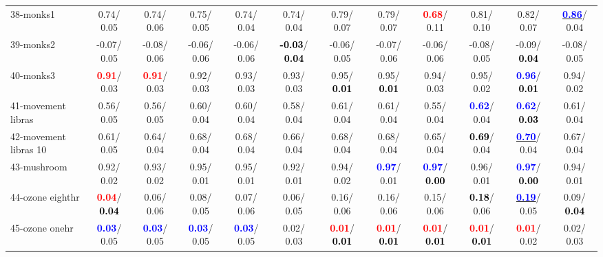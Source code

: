 \begin{table}[h]
\begin{center}
{\begin{tabular}{lc|c|c|c|c|c|c|c|c|c|c}
38-monks1 &   0.74/  0.05 &   0.74/  0.06 &   0.75/  0.05 &   0.74/  0.04 &   0.74/  0.04 &   0.79/  0.07 &   0.79/  0.07 & \textcolor{red}{\textbf{  0.68}}/  0.11 &   0.81/  0.10 &   0.82/  0.07 & \underline{\textcolor{blue}{\textbf{  0.86}}}/  0.04 \\
39-monks2 &  -0.07/  0.05 &  -0.08/  0.06 &  -0.06/  0.06 &  -0.06/  0.06 & \textcolor{black}{\textbf{ -0.03}}/\textcolor{black}{\textbf{  0.04}} &  -0.06/  0.05 &  -0.07/  0.06 &  -0.06/  0.06 &  -0.08/  0.05 &  -0.09/\textcolor{black}{\textbf{  0.04}} &  -0.08/  0.05 \\ \hline
40-monks3 & \textcolor{red}{\textbf{  0.91}}/  0.03 & \textcolor{red}{\textbf{  0.91}}/  0.03 &   0.92/  0.03 &   0.93/  0.03 &   0.93/  0.03 &   0.95/\textcolor{black}{\textbf{  0.01}} &   0.95/\textcolor{black}{\textbf{  0.01}} &   0.94/  0.03 &   0.95/  0.02 & \textcolor{blue}{\textbf{  0.96}}/\textcolor{black}{\textbf{  0.01}} &   0.94/  0.02 \\
41-movement libras &   0.56/  0.05 &   0.56/  0.05 &   0.60/  0.04 &   0.60/  0.04 &   0.58/  0.04 &   0.61/  0.04 &   0.61/  0.04 &   0.55/  0.04 & \textcolor{blue}{\textbf{  0.62}}/  0.04 & \textcolor{blue}{\textbf{  0.62}}/\textcolor{black}{\textbf{  0.03}} &   0.61/  0.04 \\
42-movement libras 10 &   0.61/  0.05 &   0.64/  0.04 &   0.68/  0.04 &   0.68/  0.04 &   0.66/  0.04 &   0.68/  0.04 &   0.68/  0.04 &   0.65/  0.04 & \textcolor{black}{\textbf{  0.69}}/  0.04 & \underline{\textcolor{blue}{\textbf{  0.70}}}/  0.04 &   0.67/  0.04 \\
43-mushroom &   0.92/  0.02 &   0.93/  0.02 &   0.95/  0.01 &   0.95/  0.01 &   0.92/  0.01 &   0.94/  0.02 & \textcolor{blue}{\textbf{  0.97}}/  0.01 & \textcolor{blue}{\textbf{  0.97}}/\textcolor{black}{\textbf{  0.00}} &   0.96/  0.01 & \textcolor{blue}{\textbf{  0.97}}/\textcolor{black}{\textbf{  0.00}} &   0.94/  0.01 \\
44-ozone eighthr & \textcolor{red}{\textbf{  0.04}}/\textcolor{black}{\textbf{  0.04}} &   0.06/  0.06 &   0.08/  0.05 &   0.07/  0.06 &   0.06/  0.05 &   0.16/  0.06 &   0.16/  0.06 &   0.15/  0.06 & \textcolor{black}{\textbf{  0.18}}/  0.06 & \underline{\textcolor{blue}{\textbf{  0.19}}}/  0.05 &   0.09/\textcolor{black}{\textbf{  0.04}} \\
45-ozone onehr & \textcolor{blue}{\textbf{  0.03}}/  0.05 & \textcolor{blue}{\textbf{  0.03}}/  0.05 & \textcolor{blue}{\textbf{  0.03}}/  0.05 & \textcolor{blue}{\textbf{  0.03}}/  0.05 &   0.02/  0.03 & \textcolor{red}{\textbf{  0.01}}/\textcolor{black}{\textbf{  0.01}} & \textcolor{red}{\textbf{  0.01}}/\textcolor{black}{\textbf{  0.01}} & \textcolor{red}{\textbf{  0.01}}/\textcolor{black}{\textbf{  0.01}} & \textcolor{red}{\textbf{  0.01}}/\textcolor{black}{\textbf{  0.01}} & \textcolor{red}{\textbf{  0.01}}/  0.02 &   0.02/  0.03 \\

\end{tabular}}
\end{center}
\end{table}
